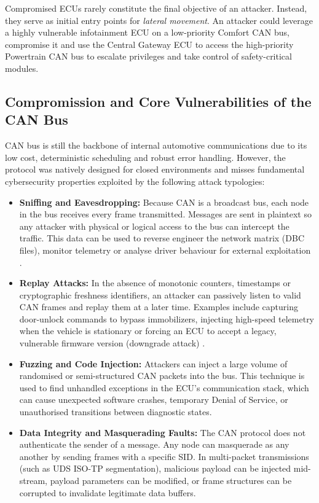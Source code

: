 Compromised \glspl{ECU} rarely constitute the final objective of an attacker. Instead, they serve as initial entry points for \textit{lateral movement}. An attacker could leverage a highly vulnerable infotainment \gls{ECU} on a low-priority Comfort \gls{CAN} bus, compromise it and use the Central Gateway \gls{ECU} to access the high-priority Powertrain \gls{CAN} bus to escalate privileges and take control of safety-critical modules.

\subsection{Compromission and Core Vulnerabilities of the CAN Bus}
CAN bus is still the backbone of internal automotive communications due to its low cost, deterministic scheduling and robust error handling. However, the protocol was natively designed for closed environments and misses fundamental cybersecurity properties exploited by the following attack typologies:

\begin{itemize}
    \item \textbf{Sniffing and Eavesdropping:} Because \gls{CAN} is a broadcast bus, each node in the bus receives every frame transmitted. Messages are sent in plaintext so any attacker with physical or logical access to the bus can intercept the traffic. This data can be used to reverse engineer the network matrix (\gls{DBC} files), monitor telemetry or analyse driver behaviour for external exploitation \cite{buscemi2023survey}.
    
    \item \textbf{Replay Attacks:}  In the absence of monotonic counters, timestamps or cryptographic freshness identifiers, an attacker can passively listen to valid \gls{CAN} frames and replay them at a later time. Examples include capturing door-unlock commands to bypass immobilizers, injecting high-speed telemetry when the vehicle is stationary or forcing an \gls{ECU} to accept a legacy, vulnerable firmware version (downgrade attack) \cite{miller2015remote}.
    
    \item \textbf{Fuzzing and Code Injection:} Attackers can inject a large volume of randomised or semi-structured CAN packets into the bus. This technique is used to find unhandled exceptions in the \gls{ECU}'s communication stack, which can cause unexpected software crashes, temporary Denial of Service, or unauthorised transitions between diagnostic states.
    
    \item \textbf{Data Integrity and Masquerading Faults:} The \gls{CAN} protocol does not authenticate the sender of a message. Any node can masquerade as any another by sending frames with a specific \gls{SID}. In multi-packet transmissions (such as \gls{UDS} ISO-TP segmentation), malicious payload can be injected mid-stream,  payload parameters can be modified, or frame structures can be corrupted to invalidate legitimate data buffers.
\end{itemize}

